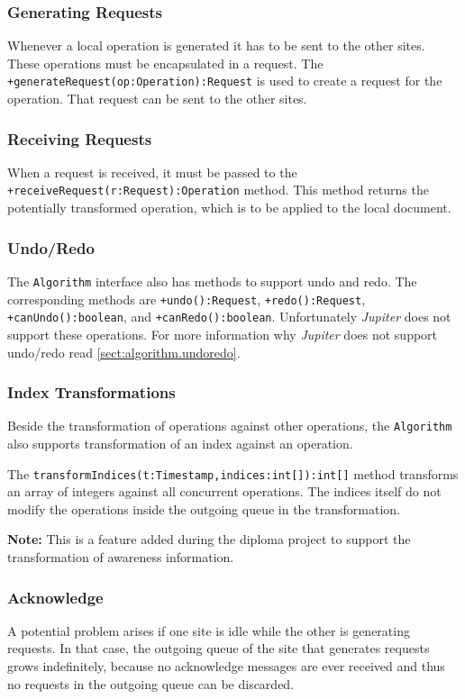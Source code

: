 \subsubsection{Generating Requests}
Whenever a local operation is generated it has to be sent to the other sites.
These operations must be encapsulated in a request. The
\texttt{+generate\-Request(op:Operation):Request} is used to create a request
for the operation. That request can be sent to the other sites.

\subsubsection{Receiving Requests}
When a request is received, it must be passed to the
\texttt{+receive\-Request(r:Request):Operation} method. This method returns
the potentially transformed operation, which is to be applied to the
local document.

\subsubsection{Undo/Redo}
The \texttt{Algorithm} interface also has methods to support undo and redo.
The corresponding methods are 
\texttt{+undo():Request}, \texttt{+redo():Request},
\texttt{+canUndo():boolean}, and \texttt{+canRedo():boolean}. 
Unfortunately
\emph{Jupiter} does not support these operations. For more information why
\emph{Jupiter} does not support undo/redo read \ref{sect:algorithm.undoredo}.

\subsubsection{Index Transformations}
Beside the transformation of operations against other operations, the
\texttt{Algorithm} also supports transformation of an index against an
operation.

The \texttt{transformIndices(t:Timestamp,indices:int[]):int[]} method transforms
an array of integers against all concurrent operations. The indices itself
do not modify the operations inside the outgoing queue in the transformation.

\textbf{Note:} This is a feature added during the diploma project to support
the transformation of awareness information.

\subsubsection{Acknowledge}
A potential problem arises if one site is idle while the other is generating
requests. In that case, the outgoing queue of the site that generates requests
grows indefinitely, because no acknowledge messages are ever received and thus
no requests in the outgoing queue can be discarded.

